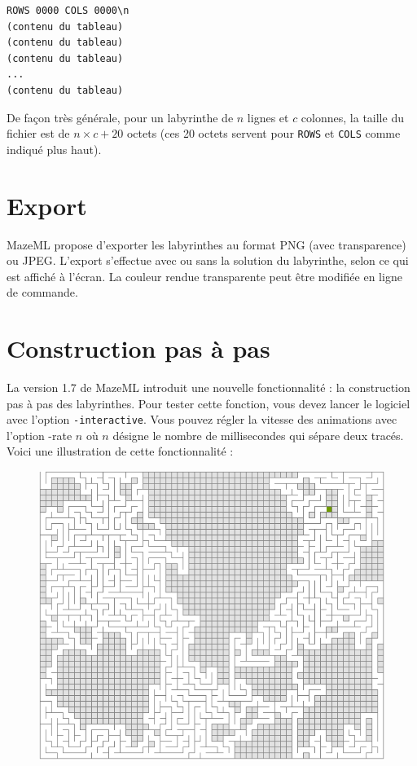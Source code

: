 \documentclass[11pt]{article}
\begin{document}
\begin{verbatim}
ROWS 0000 COLS 0000\n
(contenu du tableau)
(contenu du tableau)
(contenu du tableau)
...
(contenu du tableau)
\end{verbatim}

    De façon très générale, pour un labyrinthe de $n$ lignes et $c$ colonnes, la
  taille du fichier est de $n\times c + 20$ octets (ces 20 octets servent pour 
  \texttt{ROWS} et \texttt{COLS} comme indiqué plus haut).


    \section{Export}

    MazeML propose d'exporter les labyrinthes au format PNG (avec transparence)
  ou JPEG. L'export s'effectue avec ou sans la solution du labyrinthe, selon ce
  qui est affiché à l'écran. La couleur rendue transparente peut être modifiée 
  en ligne de commande.


    \section{Construction pas à pas}

    La version 1.7 de MazeML introduit une nouvelle fonctionnalité : la 
  construction pas à pas des labyrinthes. Pour tester cette fonction, vous devez
  lancer le logiciel avec l'option \texttt{-interactive}. Vous pouvez régler la
  vitesse des animations avec l'option -rate $n$ où $n$ désigne le nombre de 
  millisecondes qui sépare deux tracés. Voici une illustration de cette 
  fonctionnalité :

  \begin{figure}[!ht]
    \centering
    \includegraphics[scale=0.5]{MazeML-step-by-step-drawing.png}
  \end{figure}
\end{document}
